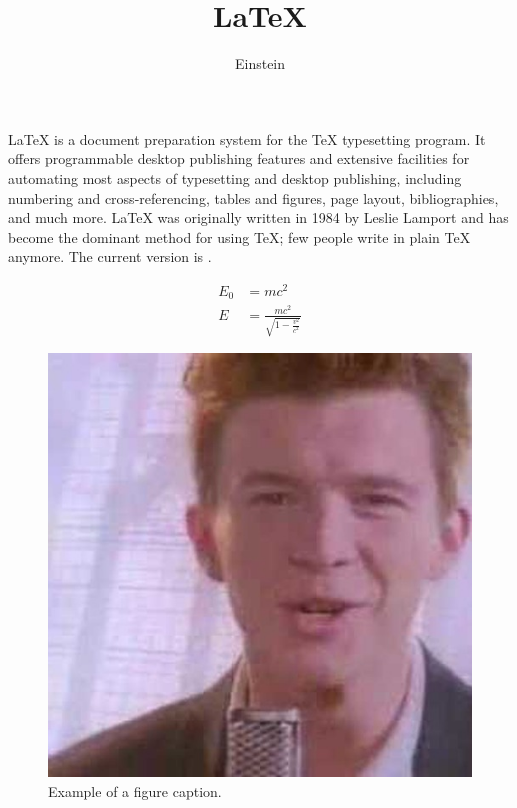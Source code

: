 \documentclass{scrarticle}
\title{\LaTeX}
\author{Einstein}
\begin{document}
\maketitle

\LaTeX{} is a document preparation system for the \TeX{} typesetting program. It offers programmable desktop publishing features and extensive facilities for automating most aspects of typesetting and desktop publishing, including numbering and  cross-referencing, tables and figures, page layout, bibliographies, and much more. \LaTeX{} was originally written in 1984 by Leslie Lamport and has become the  dominant method for using \TeX; few people write in plain \TeX{} anymore. The current version is \LaTeXe.

\begin{align}
E_0 &= mc^2 \\
E &= \frac{mc^2}{\sqrt{1-\frac{v^2}{c^2}}}
\end{align}

\begin{figure}[htbp]
\centerline{\includegraphics[width=0.5\linewidth]{troll.jpg}}
\caption{Example of a figure caption.}
\label{fig}
\end{figure}


\end{document}
